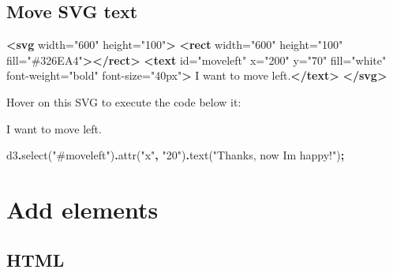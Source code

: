\documentclass[
  openany]{book}
\newenvironment{Shaded}{\begin{snugshade}}{\end{snugshade}}
\newcommand{\FunctionTok}[1]{\textcolor[rgb]{0.00,0.00,0.00}{#1}}
\newcommand{\KeywordTok}[1]{\textcolor[rgb]{0.13,0.29,0.53}{\textbf{#1}}}
\newcommand{\NormalTok}[1]{#1}
\newcommand{\OperatorTok}[1]{\textcolor[rgb]{0.81,0.36,0.00}{\textbf{#1}}}
\newcommand{\OtherTok}[1]{\textcolor[rgb]{0.56,0.35,0.01}{#1}}
\newcommand{\StringTok}[1]{\textcolor[rgb]{0.31,0.60,0.02}{#1}}
\begin{document}
\hypertarget{move-svg-text}{%
\subsection{Move SVG text}\label{move-svg-text}}

\begin{Shaded}
\begin{Highlighting}[]
\KeywordTok{\textless{}svg}\OtherTok{ width=}\StringTok{"600"}\OtherTok{ height=}\StringTok{"100"}\KeywordTok{\textgreater{}}
  \KeywordTok{\textless{}rect}\OtherTok{ width=}\StringTok{"600"}\OtherTok{ height=}\StringTok{"100"}\OtherTok{ fill=}\StringTok{"\#326EA4"}\KeywordTok{\textgreater{}\textless{}/rect\textgreater{}}
  \KeywordTok{\textless{}text}\OtherTok{ id=}\StringTok{"moveleft"}\OtherTok{ x=}\StringTok{"200"}\OtherTok{ y=}\StringTok{"70"}\OtherTok{ fill=}\StringTok{"white"}\OtherTok{ font{-}weight=}\StringTok{"bold"}\OtherTok{ font{-}size=}\StringTok{"40px"}\KeywordTok{\textgreater{}}
\NormalTok{      I want to move left.}\KeywordTok{\textless{}/text\textgreater{}}
\KeywordTok{\textless{}/svg\textgreater{}}  
\end{Highlighting}
\end{Shaded}

Hover on this SVG to execute the code below it:

I want to move left.

\hypertarget{move}{}
\begin{Shaded}
\begin{Highlighting}[]
\NormalTok{d3}\OperatorTok{.}\FunctionTok{select}\NormalTok{(}\StringTok{"\#moveleft"}\NormalTok{)}\OperatorTok{.}\FunctionTok{attr}\NormalTok{(}\StringTok{"x"}\OperatorTok{,} \StringTok{"20"}\NormalTok{)}\OperatorTok{.}\FunctionTok{text}\NormalTok{(}\StringTok{"Thanks, now I\textquotesingle{}m happy!"}\NormalTok{)}\OperatorTok{;}
\end{Highlighting}
\end{Shaded}

\hypertarget{add-elements}{%
\section{\texorpdfstring{Add elements }{Add elements }}\label{add-elements}}

\hypertarget{html-1}{%
\subsection{HTML}\label{html-1}}
\end{document}
